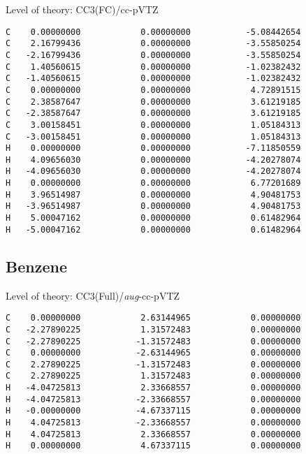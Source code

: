 \documentclass[journal=jctcce,manuscript=article,layout=traditional]{achemso}
\newcommand{\TZ}{cc-pVTZ}
\newcommand{\AVTZ}{\emph{aug}-cc-pVTZ}
\begin{document}
\begin{singlespace}
Level of theory: CC3(FC)/{\TZ}
\begin{verbatim}
C    0.00000000            0.00000000           -5.08442654
C    2.16799436            0.00000000           -3.55850254
C   -2.16799436            0.00000000           -3.55850254
C    1.40560615            0.00000000           -1.02382432
C   -1.40560615            0.00000000           -1.02382432
C    0.00000000            0.00000000            4.72891515
C    2.38587647            0.00000000            3.61219185
C   -2.38587647            0.00000000            3.61219185
C    3.00158451            0.00000000            1.05184313
C   -3.00158451            0.00000000            1.05184313
H    0.00000000            0.00000000           -7.11850559
H    4.09656030            0.00000000           -4.20278074
H   -4.09656030            0.00000000           -4.20278074
H    0.00000000            0.00000000            6.77201689
H    3.96514987            0.00000000            4.90481753
H   -3.96514987            0.00000000            4.90481753
H    5.00047162            0.00000000            0.61482964
H   -5.00047162            0.00000000            0.61482964
\end{verbatim}
\end{singlespace}

\subsection*{Benzene}

\begin{singlespace}
Level of theory: CC3(Full)/{\AVTZ}
\begin{verbatim}
C    0.00000000            2.63144965            0.00000000
C   -2.27890225            1.31572483            0.00000000
C   -2.27890225           -1.31572483            0.00000000
C    0.00000000           -2.63144965            0.00000000
C    2.27890225           -1.31572483            0.00000000
C    2.27890225            1.31572483            0.00000000
H   -4.04725813            2.33668557            0.00000000
H   -4.04725813           -2.33668557            0.00000000
H   -0.00000000           -4.67337115            0.00000000
H    4.04725813           -2.33668557            0.00000000
H    4.04725813            2.33668557            0.00000000
H    0.00000000            4.67337115            0.00000000
\end{verbatim}
\end{singlespace}
\end{document}
